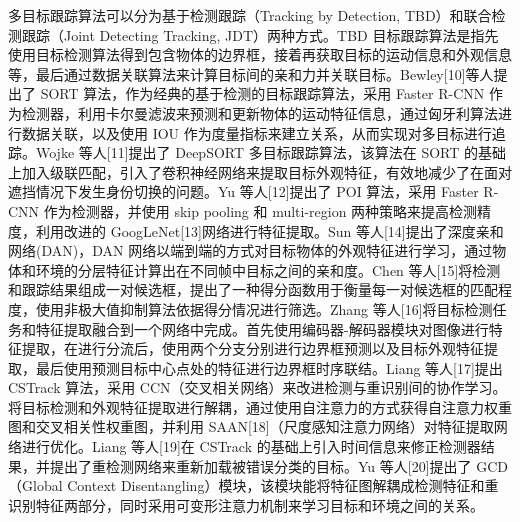 多目标跟踪算法可以分为基于检测跟踪（Tracking by Detection, TBD）和联合检测跟踪（Joint Detecting Tracking, JDT）两种方式。TBD 目标跟踪算法是指先使用目标检测算法得到包含物体的边界框，接着再获取目标的运动信息和外观信息等，最后通过数据关联算法来计算目标间的亲和力并关联目标。Bewley[10]等人提出了 SORT 算法，作为经典的基于检测的目标跟踪算法，采用 Faster R-CNN 作为检测器，利用卡尔曼滤波来预测和更新物体的运动特征信息，通过匈牙利算法进行数据关联，以及使用 IOU 作为度量指标来建立关系，从而实现对多目标进行追踪。Wojke 等人[11]提出了 DeepSORT 多目标跟踪算法，该算法在 SORT 的基础上加入级联匹配，引入了卷积神经网络来提取目标外观特征，有效地减少了在面对遮挡情况下发生身份切换的问题。Yu 等人[12]提出了 POI 算法，采用 Faster R-CNN 作为检测器，并使用 skip pooling 和 multi-region 两种策略来提高检测精度，利用改进的 GoogLeNet[13]网络进行特征提取。Sun 等人[14]提出了深度亲和网络(DAN)，DAN 网络以端到端的方式对目标物体的外观特征进行学习，通过物体和环境的分层特征计算出在不同帧中目标之间的亲和度。Chen 等人[15]将检测和跟踪结果组成一对候选框，提出了一种得分函数用于衡量每一对候选框的匹配程度，使用非极大值抑制算法依据得分情况进行筛选。Zhang 等人[16]将目标检测任务和特征提取融合到一个网络中完成。首先使用编码器-解码器模块对图像进行特征提取，在进行分流后，使用两个分支分别进行边界框预测以及目标外观特征提取，最后使用预测目标中心点处的特征进行边界框时序联结。Liang 等人[17]提出 CSTrack 算法，采用 CCN（交叉相关网络）来改进检测与重识别间的协作学习。将目标检测和外观特征提取进行解耦，通过使用自注意力的方式获得自注意力权重图和交叉相关性权重图，并利用 SAAN[18]（尺度感知注意力网络）对特征提取网络进行优化。Liang 等人[19]在 CSTrack 的基础上引入时间信息来修正检测器结果，并提出了重检测网络来重新加载被错误分类的目标。Yu 等人[20]提出了 GCD（Global Context Disentangling）模块，该模块能将特征图解耦成检测特征和重识别特征两部分，同时采用可变形注意力机制来学习目标和环境之间的关系。

